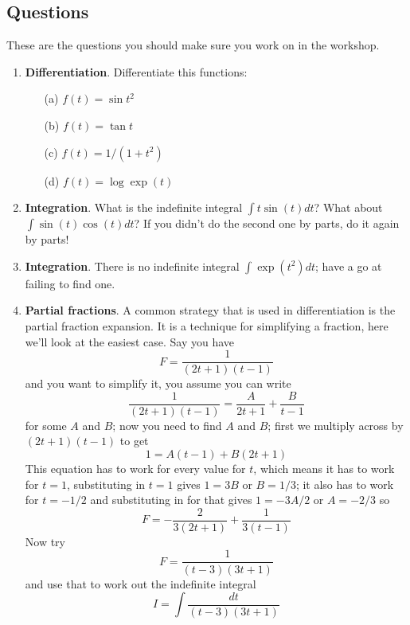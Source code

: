 \documentclass[11pt,a4paper]{scrartcl}
\begin{document}
\subsection*{Questions}

These are the questions you should make sure you work on in the workshop.

\begin{enumerate}

\item \textbf{Differentiation}. Differentiate this functions:
	\begin{itemize}
		\item[(a)] $f(t)=\sin{t^2}$
		\item[(b)] $f(t)=\tan{t}$
		\item[(c)] $f(t)=1/(1+t^2)$
		\item[(d)] $f(t)=\log{\exp{(t)}}$
	\end{itemize}

      \item \textbf{Integration}. What is the indefinite integral $\int t\sin{(t)}dt$? What about $\int \sin{(t)}\cos{(t)}dt$? If you didn't do the second one by parts, do it again by parts!

      \item \textbf{Integration}. There is no indefinite integral $\int \exp{(t^2)}dt$; have a go at failing to find one.

       \item \textbf{Partial fractions}. A common strategy that is
         used in differentiation is the partial fraction expansion. It
         is a technique for simplifying a fraction, here we'll look at
         the easiest case. Say you have
         \begin{equation}
           F=\frac{1}{(2t+1)(t-1)}
         \end{equation}
         and you want to simplify it, you assume you can write
         \begin{equation}
           \frac{1}{(2t+1)(t-1)}=\frac{A}{2t+1}+\frac{B}{t-1}
         \end{equation}
         for some $A$ and $B$; now you need to find $A$ and $B$; first we multiply across by $(2t+1)(t-1)$ to get
         \begin{equation}
           1=A(t-1)+B(2t+1)
         \end{equation}
         This equation has to work for every value for $t$, which means it has to work for $t=1$, substituting in $t=1$ gives $1=3B$ or $B=1/3$; it also has to work for $t=-1/2$ and substituting in for that gives $1=-3A/2$ or $A=-2/3$ so
         \begin{equation}
           F=-\frac{2}{3(2t+1)}+\frac{1}{3(t-1)}
         \end{equation}
         Now try
         \begin{equation}
           F=\frac{1}{(t-3)(3t+1)}
         \end{equation}
         and use that to work out the indefinite integral
         \begin{equation}
           I=\int \frac{dt}{(t-3)(3t+1)}
         \end{equation}


\end{enumerate}
\end{document}
